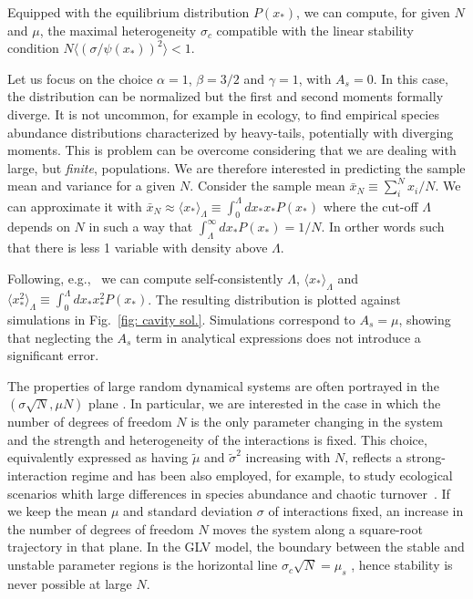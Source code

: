 \documentclass[
 prl,
 twocolumn,
 amsmath,
 amssymb,
 aps,
]{revtex4-2}
\begin{document}
Equipped with the equilibrium distribution $P(x_*)$, we can compute, for given $N$ and $\mu$, the maximal heterogeneity $\sigma_c$ compatible with the linear stability condition $N\langle (\sigma/\psi(x_*))^2\rangle < 1$.

Let us focus on the choice $\alpha=1$, $\beta=3/2$ and $\gamma=1$, with $A_s=0$.  
In this case, the distribution can be normalized but the first and second moments formally diverge. It is not uncommon, for example in ecology, to find empirical species abundance distributions characterized by heavy-tails, potentially with diverging moments.
This is problem can be overcome considering that we are dealing with large, but \emph{finite}, populations. 
We are therefore interested in predicting the sample mean and variance for a given $N$. Consider the sample mean $\bar{x}_{N}\equiv\sum_{i}^N x_i /N$. We can approximate it with $\bar{x}_N \approx \langle x_* \rangle_{\Lambda} \equiv \int_0^{\Lambda}dx_*x_*P(x_*)$ where the cut-off $\Lambda$ depends on $N$ in such a way that $\int_{\Lambda}^{\infty}dx_*P(x_*)=1/N$. In orther words such that there is less 1 variable with density above $\Lambda$.

Following, e.g.,~\cite{Cui2020,Hatton2024} we can compute self-consistently $\Lambda$, $\langle x_*\rangle_{\Lambda}$ and $\langle x_*^2\rangle_{\Lambda}\equiv\int_0^{\Lambda}dx_*x_*^2P(x_*)$. The resulting distribution is plotted against simulations in Fig.~\ref{fig: cavity sol.}. Simulations correspond to $A_s=\mu$, showing that neglecting the $A_s$ term in analytical expressions does not introduce a significant error. 

The properties of large random dynamical systems are often portrayed in the $(\sigma \sqrt{N},\mu N)$ plane \cite{bunin2017ecological}.
In particular, we are interested in the case in which the number of degrees of freedom $N$ is the only parameter changing in the system and the strength and heterogeneity of the interactions is fixed. This choice, equivalently expressed as having $\tilde{\mu}$ and $\tilde{\sigma}^2$ increasing with $N$, reflects a strong-interaction regime and has been also employed, for example, to study ecological scenarios whith large differences in species abundance and chaotic turnover~\cite{mallmin2024chaotic}.
If we keep the mean $\mu$ and standard deviation $\sigma$ of interactions fixed, an increase in the number of degrees of freedom $N$ moves the system along a square-root trajectory in that plane. In the GLV model, the boundary between the stable and unstable parameter regions is the horizontal line $\sigma_c\sqrt{N} = \mu_s$ \cite{bunin2017ecological}, hence stability is never possible at large $N$. 
\end{document}
